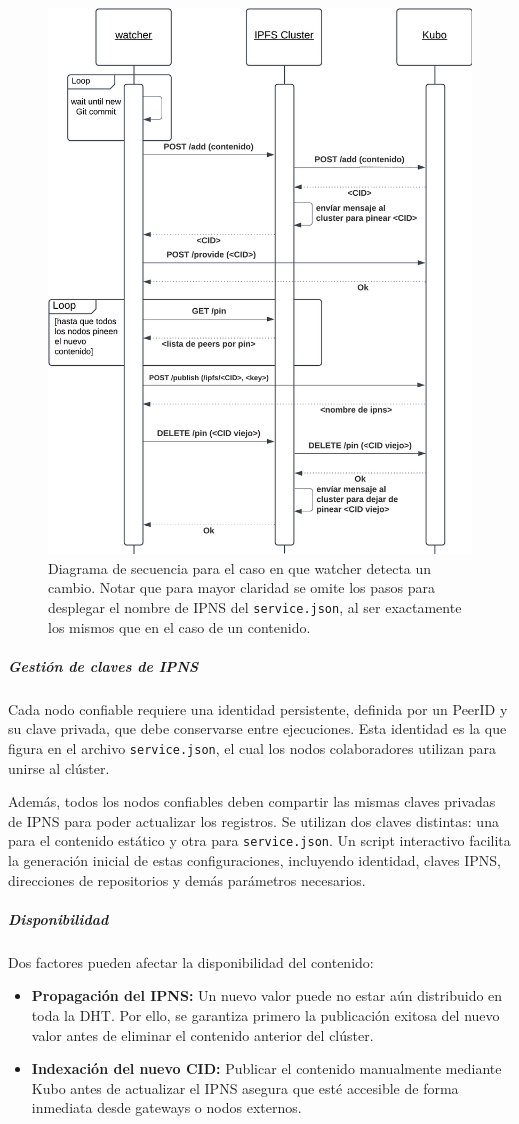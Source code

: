 \begin{figure}[H]
    \centering
    \includegraphics[width=0.5\linewidth]{img/solucion-ipfs/ds-trusted-peer.png}
    \caption{Diagrama de secuencia para el caso en que watcher detecta un cambio. Notar que para mayor claridad se omite los pasos para desplegar el nombre de IPNS del \texttt{service.json}, al ser exactamente los mismos que en el caso de un contenido.}
    \label{fig:contenedores-trusted-peer}
\end{figure}

\subparagraph{Gestión de claves de IPNS}

Cada nodo confiable requiere una identidad persistente, definida por un PeerID y su clave privada, que debe conservarse entre ejecuciones. Esta identidad es la que figura en el archivo \texttt{service.json}, el cual los nodos colaboradores utilizan para unirse al clúster.

Además, todos los nodos confiables deben compartir las mismas claves privadas de IPNS para poder actualizar los registros. Se utilizan dos claves distintas: una para el contenido estático y otra para \texttt{service.json}. Un script interactivo facilita la generación inicial de estas configuraciones, incluyendo identidad, claves IPNS, direcciones de repositorios y demás parámetros necesarios.

\subparagraph{Disponibilidad} Dos factores pueden afectar la disponibilidad del contenido:

\begin{itemize}
    \item \textbf{Propagación del IPNS:} Un nuevo valor puede no estar aún distribuido en toda la DHT. Por ello, se garantiza primero la publicación exitosa del nuevo valor antes de eliminar el contenido anterior del clúster.
    \item \textbf{Indexación del nuevo CID:} Publicar el contenido manualmente mediante Kubo antes de actualizar el IPNS asegura que esté accesible de forma inmediata desde gateways o nodos externos.
\end{itemize}


